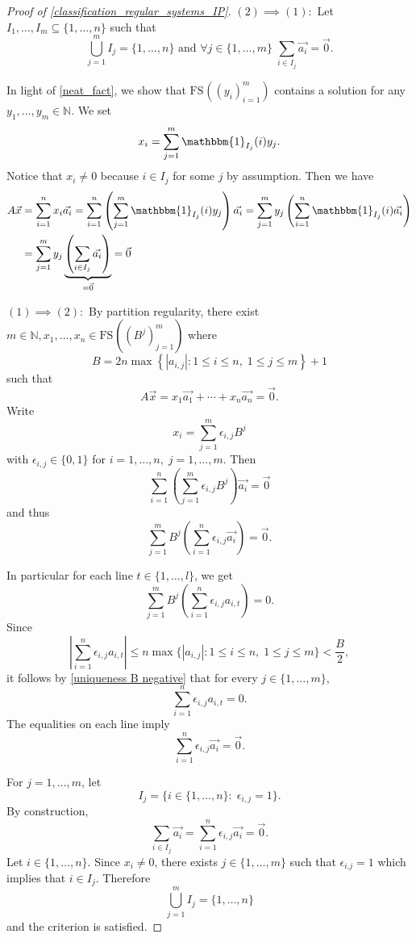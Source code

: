 \documentclass{article}
\theoremstyle{definition}
\theoremstyle{plain}
\theoremstyle{remark}
\newcommand{\N}{\ensuremath{\mathbb{N}}}
\newcommand{\abs}[1]{\left | #1 \right |}
\newcommand{\ind}{\ensuremath{ \mathbbm{1}}}
\newcommand{\FS}[2][]{\ensuremath{\mathrm{FS}^{#1}\left(#2\right)}}
\begin{document}
\begin{proof}[Proof of \cref{classification_regular_systems_IP}]
    $(2) \implies (1):$ Let $I_1,\ldots, I_m \subseteq \{1,\ldots,n\}$ such that 
        $$\bigcup_{j=1}^m I_j = \{1,\ldots,n\} \text{ and } \forall j \in \{1,\ldots,m\} \; \sum_{i \in I_j} \Vec{a_i} = \Vec{0}.$$

        In light of \cref{neat_fact}, we show that $\FS{(y_i)_{i=1}^m}$ contains a solution for any $y_1,\ldots,y_m \in \N$. We set 
        $$x_i = \sum_{j=1}^m \ind_{I_j}(i) y_j.$$
        Notice that $x_i \neq 0$ because $i\in I_j$ for some $j$ by assumption. Then we have
    \begin{align*}
        A\Vec{x} &= \sum_{i=1}^n x_i \Vec{a_i}
            = \sum_{i=1}^n \left (\sum_{j=1}^m \ind_{I_j}(i) y_j \right) \Vec{a_i}
            = \sum_{j=1}^m y_j \left(\sum_{i=1}^n \ind_{I_j}(i) \Vec{a_i}\right)\\
            &= \sum_{j=1}^m y_j\underbrace{\left (\sum_{i\in I_j} \Vec{a_i} \right )}_{=\Vec{0}}
            =\Vec{0}
    \end{align*}

    
    $(1) \implies (2):$ By partition regularity, there exist $m \in \N, x_1, \ldots, x_n \in \FS{(B^j)_{j=1}^m}$ where
    $$B= 2n  \max\left\{\abs{a_{i,j}}: 1 \leq i\leq n, \; 1 \leq j \leq m \right\} + 1$$
    such that
    $$A\Vec{x}= x_1 \Vec{a_1} + \cdots + x_n \Vec{a_n} =\Vec{0}.$$
    Write $$x_i= \sum_{j=1}^m \epsilon_{i,j} B^j$$ with $\epsilon_{i,j} \in \{0,1\}$ for $i=1,\ldots,n,\; j= 1,\ldots,m$. Then
    $$\sum_{i=1}^n \left( \sum_{j=1}^m \epsilon_{i,j} B^j\right) \Vec{a_i} = \Vec{0}$$
    and thus
    $$\sum_{j=1}^m B^j\left (\sum_{i=1}^n \epsilon_{i,j} \Vec{a_i} \right )= \Vec{0}.$$
    
    In particular for each line $ t \in \{1,\ldots,l\}$, we get
    $$\sum_{j=1}^m B^j\left (\sum_{i=1}^n \epsilon_{i,j} a_{i,t} \right )= 0.$$
    Since $$\abs{\sum_{i=1}^n   \epsilon_{i,j} a_{i,t}} \leq n \max\{\abs{a_{i,j}}: 1 \leq i\leq n, \; 1 \leq j \leq m\} < \frac{B}{2},$$
    it follows by \cref{uniqueness B negative} that for every $j\in \{1,\ldots,m\}$,
    $$\sum_{i=1}^n \epsilon_{i,j} a_{i,t} = 0.$$
    The equalities on each line imply
    $$\sum_{i=1}^n \epsilon_{i,j} \Vec{a_i}= \Vec{0}.$$
    
    For $j=1,\ldots,m$, let $$I_j = \{i \in \{1,\ldots,n\}: \; \epsilon_{i,j}= 1\}.$$ By construction,
    $$\sum_{i\in I_j} \Vec{a_i} = \sum_{i=1}^n  \epsilon_{i,j} \Vec{a_i} = \Vec{0}.$$
    Let $i \in \{1,\ldots,n\}$. Since $x_i \neq 0$, there exists $j\in \{1,\ldots,m\}$ such that $\epsilon_{i.j}= 1$ which implies that $i \in I_j$. Therefore $$\bigcup_{j=1}^m I_j = \{1,\ldots,n\}$$ and the criterion is satisfied.    
\end{proof}
\end{document}
